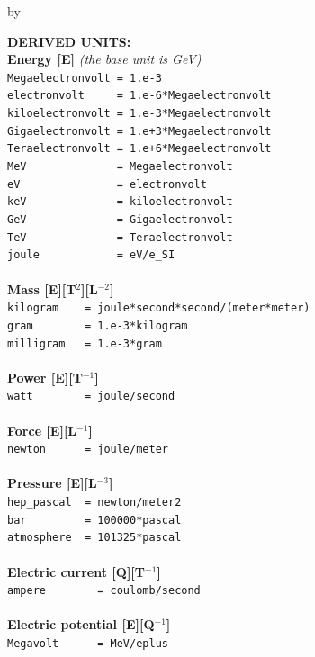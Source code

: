 \documentclass[twoside]{article}
\newcommand{\entrylabel}[1]{\mbox{\textbf{{#1}}}\hfil}%
\newenvironment{entry}
{\begin{list}{}%
    {\renewcommand{\makelabel}{\entrylabel}%
     \setlength{\labelwidth}{90pt}%
     \setlength{\leftmargin}{\labelwidth}
     \advance\leftmargin by \labelsep%
      }%
    }%
  {\end{list}}
\newcommand{\Entrylabel}[1]%
{\raisebox{0pt}[1ex][0pt]{\makebox[\labelwidth][l]%
    {\parbox[t]{\labelwidth}{\hspace{0pt}\textbf{{#1}}}}}}
\newenvironment{Entry}%
{\renewcommand{\entrylabel}{\Entrylabel}\begin{entry}}%
  {\end{entry}}
\begin{document}
\begin{description}
\begin{Entry}
{\bf DERIVED UNITS: \\Energy [E]} {\it (the base unit is GeV)}\\
  \verb+Megaelectronvolt = 1.e-3+ \\ 
  \verb+electronvolt     = 1.e-6*Megaelectronvolt+ \\ 
  \verb+kiloelectronvolt = 1.e-3*Megaelectronvolt+ \\ 
  \verb#Gigaelectronvolt = 1.e+3*Megaelectronvolt# \\ 
  \verb#Teraelectronvolt = 1.e+6*Megaelectronvolt# \\ 
  \verb+MeV              = Megaelectronvolt+ \\   
  \verb+eV               = electronvolt+ \\
  \verb+keV              = kiloelectronvolt+ \\
  \verb#GeV              = Gigaelectronvolt# \\  
  \verb#TeV              = Teraelectronvolt# \\
  \verb+joule            = eV/e_SI+ \\ \\
{\bf Mass [E][T$^{2}$][L$^{-2}$]} \\
  \verb+kilogram    = joule*second*second/(meter*meter)+ \\
  \verb+gram        = 1.e-3*kilogram+ \\
  \verb+milligram   = 1.e-3*gram+ \\ \\
{\bf Power [E][T$^{-1}$]} \\
  \verb+watt        = joule/second+ \\ \\
{\bf Force [E][L$^{-1}$]} \\
  \verb+newton      = joule/meter+ \\ \\
{\bf Pressure [E][L$^{-3}$]} \\
  \verb+hep_pascal  = newton/meter2+ \\
  \verb+bar         = 100000*pascal+ \\
  \verb+atmosphere  = 101325*pascal+ \\ \\
{\bf Electric current [Q][T$^{-1}$]} \\
  \verb+ampere        = coulomb/second+ \\ \\
{\bf Electric potential [E][Q$^{-1}$]} \\
  \verb+Megavolt      = MeV/eplus+ \\

\end{Entry}
\end{description}
\end{document}
